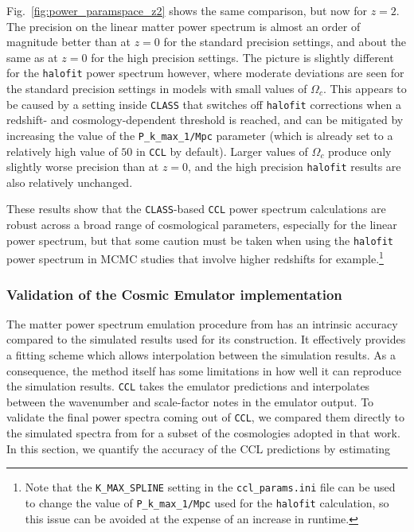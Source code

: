 \documentclass[\docopts]{\docclass}
\newcommand{\ccl}{{\tt CCL}\xspace}
\newcommand{\halofit}{{\tt halofit}\xspace}
\newcommand{\class}{{\tt CLASS}\xspace}
\begin{document}
Fig.~\ref{fig:power_paramspace_z2} shows the same comparison, but now for $z=2$. The precision on the linear matter power spectrum is almost an order of magnitude better than at $z=0$ for the standard precision settings, and about the same as at $z=0$ for the high precision settings. The picture is slightly different for the \halofit power spectrum however, where moderate deviations are seen for the standard precision settings in models with small values of $\Omega_c$. This appears to be caused by a setting inside \class that switches off \halofit corrections when a redshift- and cosmology-dependent threshold is reached, and can be mitigated by increasing the value of the {\tt P\_k\_max\_1/Mpc} parameter (which is already set to a relatively high value of $50$ in \ccl by default). Larger values of $\Omega_c$ produce only slightly worse precision than at $z=0$, and the high precision \halofit results are also relatively unchanged.

These results show that the \class-based \ccl power spectrum calculations are robust across a broad range of cosmological parameters, especially for the linear power spectrum, but that some caution must be taken when using the \halofit power spectrum in MCMC studies that involve higher redshifts for example.\footnote{Note that the {\tt K\_MAX\_SPLINE} setting in the {\tt ccl\_params.ini} file can be used to change the value of {\tt P\_k\_max\_1/Mpc} used for the \halofit calculation, so this issue can be avoided at the expense of an increase in runtime.}


\subsubsection{Validation of the Cosmic Emulator implementation}
\label{sec:cosmicemu}

The matter power spectrum emulation procedure from \citet{Lawrence17} has an intrinsic accuracy compared to the simulated results used for its construction. It effectively provides a fitting scheme which allows interpolation between the simulation results. As a consequence, the method itself has some limitations in how well it can reproduce the simulation results. \ccl takes the emulator predictions and interpolates between the wavenumber and scale-factor notes in the emulator output. To validate the final power spectra coming out of \ccl, we compared them directly to the simulated spectra from \citet{Lawrence17} for a subset of the cosmologies adopted in that work. In this section, we quantify the accuracy of the CCL predictions by estimating
\end{document}
